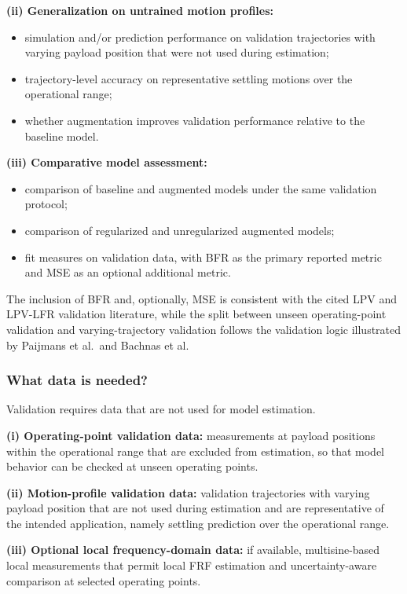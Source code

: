 \textbf{(ii) Generalization on untrained motion profiles:}
\begin{itemize}
    \item simulation and/or prediction performance on validation trajectories with varying payload position that were not used during estimation;
    \item trajectory-level accuracy on representative settling motions over the operational range;
    \item whether augmentation improves validation performance relative to the baseline model.
\end{itemize}

\textbf{(iii) Comparative model assessment:}
\begin{itemize}
    \item comparison of baseline and augmented models under the same validation protocol;
    \item comparison of regularized and unregularized augmented models;
    \item fit measures on validation data, with BFR as the primary reported metric and MSE as an optional additional metric.
\end{itemize}

The inclusion of BFR and, optionally, MSE is consistent with the cited LPV and LPV-LFR validation literature, while the split between unseen operating-point validation and varying-trajectory validation follows the validation logic illustrated by Paijmans et al.\ and Bachnas et al.

\subsubsection{What data is needed?}

Validation requires data that are not used for model estimation.

\textbf{(i) Operating-point validation data:} measurements at payload positions within the operational range that are excluded from estimation, so that model behavior can be checked at unseen operating points.

\textbf{(ii) Motion-profile validation data:} validation trajectories with varying payload position that are not used during estimation and are representative of the intended application, namely settling prediction over the operational range.

\textbf{(iii) Optional local frequency-domain data:} if available, multisine-based local measurements that permit local FRF estimation and uncertainty-aware comparison at selected operating points.

